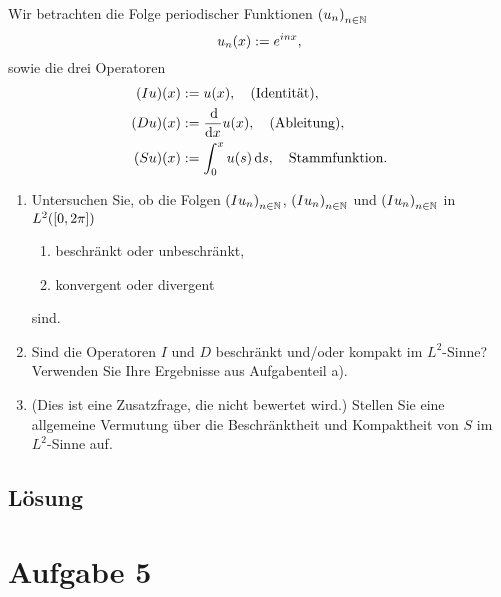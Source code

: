 \documentclass{exercise}
\begin{document}
    \begin{problem}
        Wir betrachten die Folge periodischer Funktionen \(\parentheses*{u_n}_{n \in \N}\)
        \[
            u_n\parentheses*{x} := e^{inx},
        \]
        sowie die drei Operatoren
        \begin{align*}
            \parentheses*{Iu}\parentheses*{x} &:= u\parentheses*{x}, \quad \text{(Identität)},\\
            \parentheses*{Du}\parentheses*{x} &:= \frac{\d}{\d x}u\parentheses*{x}, \quad \text{(Ableitung)},\\
            \parentheses*{Su}\parentheses*{x} &:= \int_0^x u\parentheses*{s}\d s, \quad \text{Stammfunktion}.
        \end{align*}
        \begin{enumerate}
            \item Untersuchen Sie, ob die Folgen \(\parentheses*{Iu_n}_{n \in \N}\), \(\parentheses*{Iu_n}_{n \in \N}\) und \(\parentheses*{Iu_n}_{n \in \N}\) in \(L^2\parentheses*{\brackets*{0, 2\pi}}\)
            \begin{enumerate}
                \item beschränkt oder unbeschränkt,
                \item konvergent oder divergent
            \end{enumerate}
            sind.
            \item Sind die Operatoren \(I\) und \(D\) beschränkt und/oder kompakt im \(L^2\)-Sinne?
            Verwenden Sie Ihre Ergebnisse aus Aufgabenteil a).
            \item (Dies ist eine Zusatzfrage, die nicht bewertet wird.)
            Stellen Sie eine allgemeine Vermutung über die Beschränktheit und Kompaktheit von \(S\) im \(L^2\)-Sinne auf.
        \end{enumerate}
    \end{problem}
    
    \subsection*{Lösung}


    \section*{Aufgabe 5}
    
\end{document}
